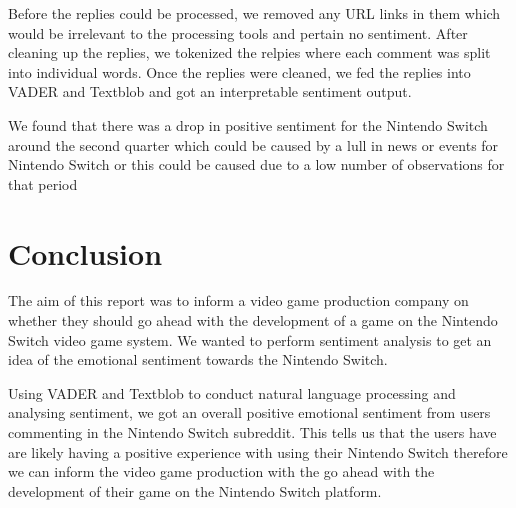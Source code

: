 \documentclass{report}
\begin{document}
Before the replies could be processed, we removed any URL links in them which would be irrelevant to the processing tools and pertain no sentiment. After cleaning up the replies, we tokenized the relpies
where each comment was split into individual words. Once the replies were cleaned, we fed the replies into VADER and Textblob and got an interpretable sentiment output.

We found that there was a drop in positive sentiment for the Nintendo Switch around the second quarter which could be caused by a lull in news or events for Nintendo Switch or this could be caused due to
a low number of observations for that period 

\chapter{Conclusion}

The aim of this report was to inform a video game production company on whether they should go ahead with the development of a game on the Nintendo Switch video game system. We wanted to perform
sentiment analysis to get an idea of the emotional sentiment towards the Nintendo Switch. 

Using VADER and Textblob to conduct natural language processing and analysing sentiment, we got an overall positive emotional sentiment from users commenting in the Nintendo Switch subreddit. This tells us
that the users have are likely having a positive experience with using their Nintendo Switch therefore we can inform the video game production with the go ahead with the development of their game on the
Nintendo Switch platform.
\end{document}
